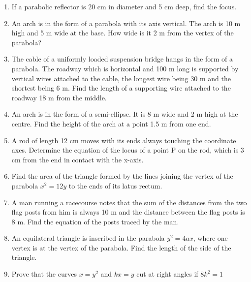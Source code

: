 \renewcommand{\theequation}{\theenumi}
\begin{enumerate}[label=\arabic*.,ref=\thesubsection.\theenumi]

\item If a parabolic reflector is 20 cm in diameter and 5 cm deep, find the focus. 
\item An arch is in the form of a parabola with its axis vertical. The arch is 10 m high and 5 m wide at the base. How wide is it 2 m from the vertex of the parabola?
\item The cable of a uniformly loaded suspension bridge hangs in the form of a parabola. The roadway which is horizontal and 100 m long is supported by vertical wires attached to the cable, the longest wire being 30 m and the shortest being 6 m. Find the length of a supporting wire attached to the roadway 18 m from the middle.
\item An arch is in the form of a semi-ellipse. It is 8 m wide and 2 m high at the centre. Find the height of the arch at a point 1.5 m from one end.
\item A rod of length 12 cm moves with its ends always touching the coordinate axes. Determine the equation of the locus of a point P on the rod, which is 3 cm from the end in contact with the x-axis.
\item Find the area of the triangle formed by the lines joining the vertex of the parabola $x^2= 12y$ to the ends of its latus rectum.
\item A man running a racecourse notes that the sum of the distances from the two flag posts from him is always 10 m and the distance between the flag posts is 8 m. Find the equation of the posts traced by the man.
\item An equilateral triangle is inscribed in the parabola $y^2 = 4 ax$, where one vertex is at the vertex of the parabola. Find the length of the side of the triangle.
%
%
 \item Prove that the curves $x = y^2$ and $kx=y$ cut at right angles if $8k^2 = 1$


\end{enumerate}
